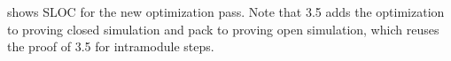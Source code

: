  shows SLOC for the new optimization pass.  Note that  3.5 adds the optimization to \ccr{} proving closed simulation
and  pack to \ccm{} proving open simulation, which reuses the proof of  3.5 for intramodule steps.

